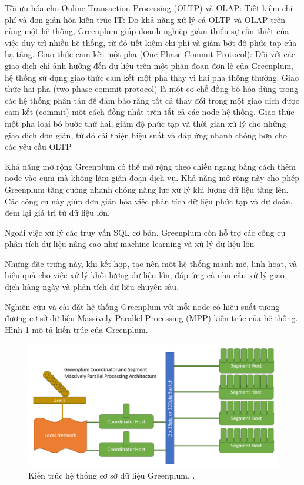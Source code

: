 \documentclass{article}[14pt]
\begin{document}
{Tối ưu hóa cho Online Transaction Processing (OLTP) và OLAP: Tiết kiệm chi phí và đơn giản hóa kiến trúc IT: Do khả năng xử lý cả
OLTP và OLAP trên cùng một hệ thống, Greenplum giúp doanh
nghiệp giảm thiểu sự cần thiết của việc duy trì nhiều hệ thống, từ đó
tiết kiệm chi phí và giảm bớt độ phức tạp của hạ tầng. Giao thức cam kết một pha (One-Phase Commit Protocol): Đối với
các giao dịch chỉ ảnh hưởng đến dữ liệu trên một phân đoạn đơn lẻ
của Greenplum, hệ thống sử dụng giao thức cam kết một pha thay vì
hai pha thông thường. Giao thức hai pha (two-phase commit protocol) là một cơ chế đồng bộ
hóa dùng trong các hệ thống phân tán để đảm bảo rằng tất cả thay đổi
trong một giao dịch được cam kết (commit) một cách đồng nhất trên
tất cả các node hệ thống. Giao thức một pha loại bỏ bước thứ hai,
giảm độ phức tạp và thời gian xử lý cho những giao dịch đơn giản, từ
đó cải thiện hiệu suất và đáp ứng nhanh chóng hơn cho các yêu cầu
OLTP

Khả năng mở rộng Greenplum có thể mở rộng theo chiều ngang bằng cách thêm node vào cụm mà không làm gián đoạn dịch vụ. Khả năng mở rộng này cho phép Greenplum tăng cường nhanh chóng năng lực xử lý khi lượng dữ liệu tăng lên.
Các công cụ này giúp đơn giản hóa việc phân tích dữ liệu phức tạp và
dự đoán, đem lại giá trị từ dữ liệu lớn.

Ngoài việc xử lý các truy vấn SQL cơ bản, Greenplum còn hỗ trợ các
công cụ phân tích dữ liệu nâng cao như machine learning và xử lý dữ
liệu lớn


Những đặc trưng này, khi kết hợp, tạo nên một hệ thống mạnh mẽ, linh hoạt,
và hiệu quả cho việc xử lý khối lượng dữ liệu lớn, đáp ứng cả nhu cầu xử lý
giao dịch hàng ngày và phân tích dữ liệu chuyên sâu.



Nghiên cứu và cài đặt hệ thống Greenplum với mỗi node có hiệu suất tương
đương cơ sở dữ liệu Massively Parallel Processing (MPP) kiến trúc của hệ
thống. Hình \ref{fig:gp-architecture} mô tả kiến trúc của Greenplum.

\begin{figure}[htbp]
\centerline{\includegraphics[scale=.4]{images/gp-architecture.png}}
\captionsetup{font=Large}
\caption{Kiến trúc hệ thống cơ sở dữ liệu Greenplum. \cite{vmware_greenplum}. }
\label{fig:gp-architecture}
\end{figure}

}
\end{document}

